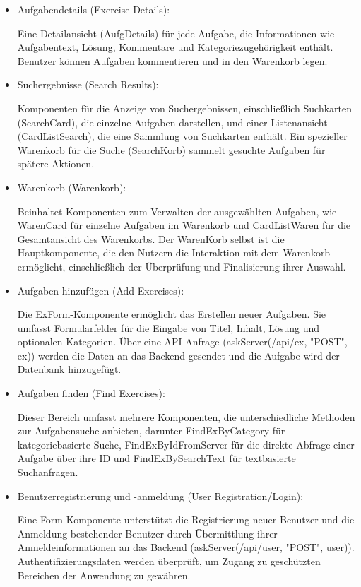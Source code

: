 \documentclass[12pt,a4paper]{article} %
\begin{document}
\begin{itemize}


\item Aufgabendetails (Exercise Details):

Eine Detailansicht (AufgDetails) für jede Aufgabe, die Informationen wie Aufgabentext, Lösung, Kommentare und Kategoriezugehörigkeit enthält. Benutzer können Aufgaben kommentieren und in den Warenkorb legen.

\item Suchergebnisse (Search Results):

Komponenten für die Anzeige von Suchergebnissen, einschließlich Suchkarten (SearchCard), die einzelne Aufgaben darstellen, und einer Listenansicht (CardListSearch), die eine Sammlung von Suchkarten enthält. Ein spezieller Warenkorb für die Suche (SearchKorb) sammelt gesuchte Aufgaben für spätere Aktionen.

\item Warenkorb (Warenkorb):

Beinhaltet Komponenten zum Verwalten der ausgewählten Aufgaben, wie WarenCard für einzelne Aufgaben im Warenkorb und CardListWaren für die Gesamtansicht des Warenkorbs. Der WarenKorb selbst ist die Hauptkomponente, die den Nutzern die Interaktion mit dem Warenkorb ermöglicht, einschließlich der Überprüfung und Finalisierung ihrer Auswahl.

\item Aufgaben hinzufügen (Add Exercises):

Die ExForm-Komponente ermöglicht das Erstellen neuer Aufgaben. Sie umfasst Formularfelder für die Eingabe von Titel, Inhalt, Lösung und optionalen Kategorien. Über eine API-Anfrage (askServer(/api/ex, "POST", ex)) werden die Daten an das Backend gesendet und die Aufgabe wird der Datenbank hinzugefügt.

\item Aufgaben finden (Find Exercises):

Dieser Bereich umfasst mehrere Komponenten, die unterschiedliche Methoden zur Aufgabensuche anbieten, darunter FindExByCategory für kategoriebasierte Suche, FindExByIdFromServer für die direkte Abfrage einer Aufgabe über ihre ID und FindExBySearchText für textbasierte Suchanfragen.

\item Benutzerregistrierung und -anmeldung (User Registration/Login):

Eine Form-Komponente unterstützt die Registrierung neuer Benutzer und die Anmeldung bestehender Benutzer durch Übermittlung ihrer Anmeldeinformationen an das Backend (askServer(/api/user, "POST", user)). Authentifizierungsdaten werden überprüft, um Zugang zu geschützten Bereichen der Anwendung zu gewähren.


\end{itemize}
\end{document}
